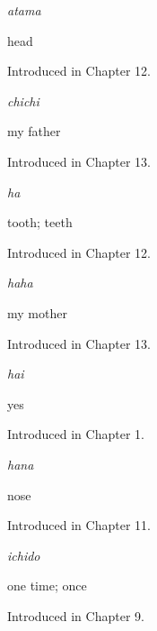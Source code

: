 \noindent\begin{minipage}[t]{\linewidth}
\raggedright
\textbf{}\enspace\emph{atama}\par
\small head\par
\footnotesize Introduced in Chapter 12.
\end{minipage}\par\medskip

\noindent\begin{minipage}[t]{\linewidth}
\raggedright
\textbf{}\enspace\emph{chichi}\par
\small my father\par
\footnotesize Introduced in Chapter 13.
\end{minipage}\par\medskip

\noindent\begin{minipage}[t]{\linewidth}
\raggedright
\textbf{}\enspace\emph{ha}\par
\small tooth; teeth\par
\footnotesize Introduced in Chapter 12.
\end{minipage}\par\medskip

\noindent\begin{minipage}[t]{\linewidth}
\raggedright
\textbf{}\enspace\emph{haha}\par
\small my mother\par
\footnotesize Introduced in Chapter 13.
\end{minipage}\par\medskip

\noindent\begin{minipage}[t]{\linewidth}
\raggedright
\textbf{}\enspace\emph{hai}\par
\small yes\par
\footnotesize Introduced in Chapter 1.
\end{minipage}\par\medskip

\noindent\begin{minipage}[t]{\linewidth}
\raggedright
\textbf{}\enspace\emph{hana}\par
\small nose\par
\footnotesize Introduced in Chapter 11.
\end{minipage}\par\medskip

\noindent\begin{minipage}[t]{\linewidth}
\raggedright
\textbf{}\enspace\emph{ichido}\par
\small one time; once\par
\footnotesize Introduced in Chapter 9.
\end{minipage}\par\medskip

